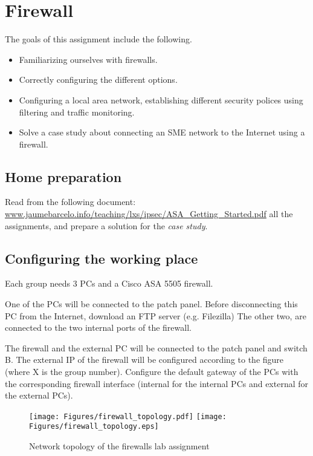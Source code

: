 \chapter{Firewall}

The goals of this assignment include the following.

\begin{itemize}
\item Familiarizing ourselves with firewalls.
\item Correctly configuring the different options.
\item Configuring a local area network, establishing different security polices using filtering and traffic monitoring.
\item Solve a case study about connecting an SME network to the Internet using a firewall.
\end{itemize}

\section{Home preparation}

Read from the following document:
\url{www.jaumebarcelo.info/teaching/lxs/ipsec/ASA_Getting_Started.pdf}
all the assignments, and prepare a solution for the \emph{case study}.

\section{Configuring the working place}
Each group needs 3 PCs and a Cisco ASA 5505 firewall.

One of the PCs will be connected to the patch panel.
Before disconnecting this PC from the Internet, download an FTP server (e.g. Filezilla)
The other two, are connected to the two internal ports of the firewall.

The firewall and the external PC will be connected to the patch panel and switch B.
The external IP of the firewall will be configured according to the figure (where X is the group number).
Configure the default gateway of the PCs with the corresponding firewall interface (internal for the internal PCs and external for the external PCs).

\begin{figure}
\centering
\ifpdf
\texttt{[image: Figures/firewall\_topology.pdf]}
\else
\texttt{[image: Figures/firewall\_topology.eps]}
\fi
\caption{Network topology of the firewalls lab assignment}
\label{fig:firewall_topology}
\end{figure}

